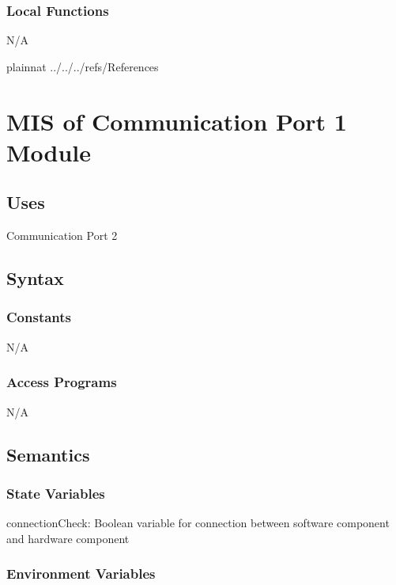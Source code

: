 \documentclass[12pt, titlepage]{article}
\begin{document}
\subsubsection{Local Functions}

N/A

\newpage

 {plainnat}
 {../../../refs/References}

\newpage

\section{MIS of Communication Port 1 Module} 



\subsection{Uses}
Communication Port 2

\subsection{Syntax}

\subsubsection{Constants}
N/A

\subsubsection{Access Programs}

N/A

\subsection{Semantics}

\subsubsection{State Variables}

connectionCheck: Boolean variable for connection between software component and hardware component

\subsubsection{Environment Variables}
\end{document}
